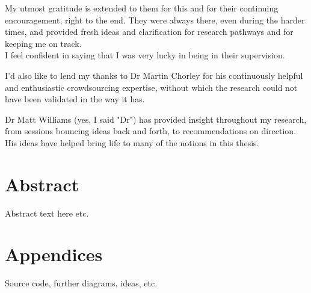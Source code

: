 My utmost gratitude is extended to them for this and for their continuing encouragement, right to the end. They were always there, even during the harder times, and provided fresh ideas and clarification for research pathways and for keeping me on track.\\
I feel confident in saying that I was very lucky in being in their supervision.

I'd also like to lend my thanks to Dr Martin Chorley for his continuously helpful and enthusiastic crowdsourcing expertise, without which the research could not have been validated in the way it has.

Dr Matt Williams (yes, I said "Dr") has provided insight throughout my research, from sessions bouncing ideas back and forth, to recommendations on direction. His ideas have helped bring life to many of the notions in this thesis.


\chapter*{Abstract}
Abstract text here etc.

\tableofcontents

\listoffigures
\listoftables



\mainmatter 








\chapter*{Appendices}
Source code, further diagrams, ideas, etc.

\backmatter

\def\baselinestretch{1.24}\normalfont





